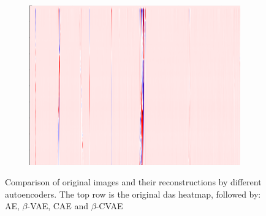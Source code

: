 \begin{figure}[!h]
\begin{subfigure}{0.33\textwidth}
        \includegraphics[width=\textwidth]{figures/test.png}
    \end{subfigure}
    
    \caption{Comparison of original images and their reconstructions by different autoencoders. The top row is the original \acrshort{das} heatmap, followed by: AE, $\beta$-VAE, CAE and $\beta$-CVAE}
    \label{fig:aereconstruct}
\end{figure}
